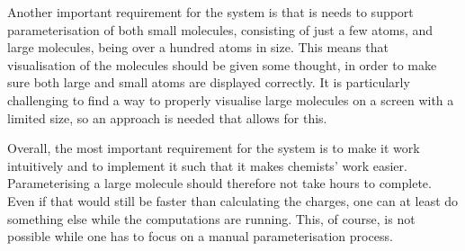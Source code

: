 Another important requirement for the system is that is needs to support parameterisation of both small molecules, consisting of just a few atoms, and large molecules, being over a hundred atoms in size. This means that visualisation of the molecules should be given some thought, in order to make sure both large and small atoms are displayed correctly. It is particularly challenging to find a way to properly visualise large molecules on a screen with a limited size, so an approach is needed that allows for this.

Overall, the most important requirement for the system is to make it work intuitively and to implement it such that it makes chemists' work easier. Parameterising a large molecule should therefore not take hours to complete. Even if that would still be faster than calculating the charges, one can at least do something else while the computations are running. This, of course, is not possible while one has to focus on a manual parameterisation process.
